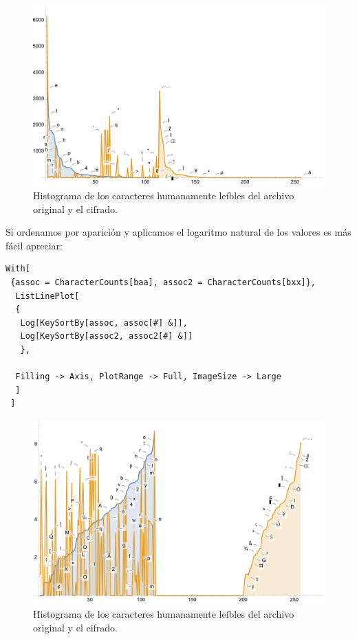 \documentclass[a4paper]{article}
\begin{document}
\begin{figure}[H]
    \centering
    \includegraphics[width=\textwidth]{histo2}
    \caption{Histograma de los caracteres humanamente leíbles del archivo
original y el cifrado.}
    \label{fig:Histo2}
\end{figure}

Si ordenamos por aparición y aplicamos el logaritmo natural de los valores es
más fácil apreciar:

\begin{verbatim}
With[
 {assoc = CharacterCounts[baa], assoc2 = CharacterCounts[bxx]},
  ListLinePlot[
  {
   Log[KeySortBy[assoc, assoc[#] &]],
   Log[KeySortBy[assoc2, assoc2[#] &]]
   },
  
  Filling -> Axis, PlotRange -> Full, ImageSize -> Large
  ]
 ]
\end{verbatim}

\begin{figure}[H]
    \centering
    \includegraphics[width=\textwidth]{histo1}
    \caption{Histograma de los caracteres humanamente leíbles del archivo
original y el cifrado.}
    \label{fig:Histo0}
\end{figure}
\end{document}
